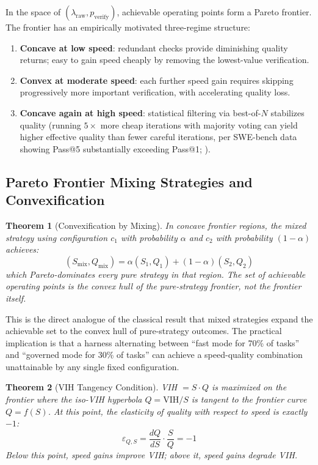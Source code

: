 \documentclass[11pt, a4paper, logo, copyright]{googledeepmind}
\newtheorem{theorem}{Theorem}[section]
\begin{document}
In the space of $(\lambda_{\text{raw}}, p_{\text{verify}})$, achievable operating points form a Pareto frontier. The frontier has an empirically motivated three-regime structure:

\begin{enumerate}[nosep]
    \item \textbf{Concave at low speed}: redundant checks provide diminishing quality returns; easy to gain speed cheaply by removing the lowest-value verification.
    \item \textbf{Convex at moderate speed}: each further speed gain requires skipping progressively more important verification, with accelerating quality loss.
    \item \textbf{Concave again at high speed}: statistical filtering via best-of-$N$ stabilizes quality (running $5\times$ more cheap iterations with majority voting can yield higher effective quality than fewer careful iterations, per SWE-bench data showing Pass@5 substantially exceeding Pass@1; \citealt{sweeffi2025}).
\end{enumerate}

\subsection{Pareto Frontier Mixing Strategies and Convexification}

\begin{theorem}[Convexification by Mixing]
\label{thm:convexification}
In concave frontier regions, the mixed strategy using configuration $c_1$ with probability $\alpha$ and $c_2$ with probability $(1-\alpha)$ achieves:
\begin{equation}
    (S_{\mathrm{mix}}, Q_{\mathrm{mix}}) = \alpha(S_1, Q_1) + (1-\alpha)(S_2, Q_2)
\end{equation}
which Pareto-dominates every pure strategy in that region. The set of achievable operating points is the \emph{convex hull} of the pure-strategy frontier, not the frontier itself.
\end{theorem}

This is the direct analogue of the classical result that mixed strategies expand the achievable set to the convex hull of pure-strategy outcomes. The practical implication is that a harness alternating between ``fast mode for 70\% of tasks'' and ``governed mode for 30\% of tasks'' can achieve a speed-quality combination unattainable by any single fixed configuration.

\begin{theorem}[VIH Tangency Condition]
\label{thm:vih-tangency}
VIH $= S \cdot Q$ is maximized on the frontier where the iso-VIH hyperbola $Q = \text{VIH}/S$ is tangent to the frontier curve $Q = f(S)$. At this point, the elasticity of quality with respect to speed is exactly $-1$:
\begin{equation}
    \varepsilon_{Q,S} = \frac{dQ}{dS} \cdot \frac{S}{Q} = -1
\end{equation}
Below this point, speed gains improve VIH; above it, speed gains degrade VIH.
\end{theorem}
\end{document}
